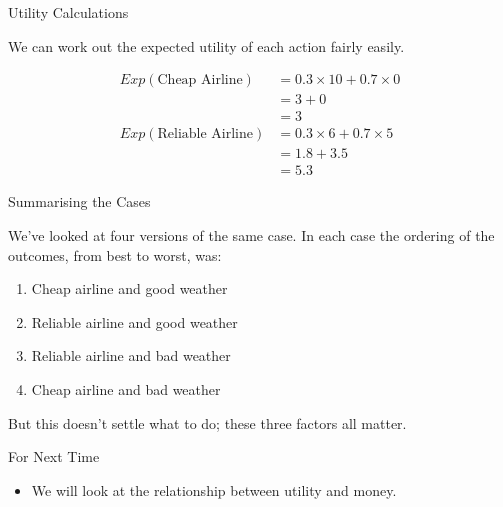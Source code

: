 \documentclass[
  ignorenonframetext,
]{beamer}
\providecommand{\tightlist}{%
  \setlength{\itemsep}{0pt}\setlength{\parskip}{0pt}}
\renewcommand{\,}{\text{, }}
\begin{document}
\begin{frame}{Utility Calculations}
\protect\hypertarget{utility-calculations-2}{}

We can work out the expected utility of each action fairly easily.

\begin{align*}
Exp(\text{Cheap Airline}) &= 0.3 \times 10 + 0.7 \times 0 \\
 &= 3 + 0 \\
 &= 3 \\
Exp(\text{Reliable Airline}) &= 0.3 \times 6 + 0.7 \times 5 \\
 &= 1.8 + 3.5 \\
 &= 5.3 
\end{align*}

\end{frame}

\begin{frame}{Summarising the Cases}
\protect\hypertarget{summarising-the-cases}{}

We've looked at four versions of the same case. In each case the
ordering of the outcomes, from best to worst, was:

\begin{enumerate}
\tightlist
\item
  Cheap airline and good weather
\item
  Reliable airline and good weather
\item
  Reliable airline and bad weather
\item
  Cheap airline and bad weather
\end{enumerate}

But this doesn't settle what to do; these three factors all matter.

\end{frame}

\begin{frame}{For Next Time}
\protect\hypertarget{for-next-time}{}

\begin{itemize}
\tightlist
\item
  We will look at the relationship between utility and money.
\end{itemize}

\end{frame}
\end{document}
